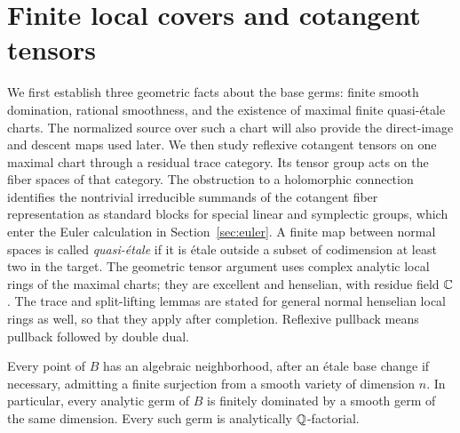 \section{Finite local covers and cotangent tensors}
\label{loc:section}
\label{sec:local-tensor}

We first establish three geometric facts about the base germs: finite
smooth domination, rational smoothness, and the existence of maximal
finite quasi-\'etale charts.  The normalized source over such a chart
will also provide the direct-image and descent maps used later.
We then study reflexive cotangent tensors on one maximal chart through
a residual trace category.  Its tensor group acts on the fiber spaces
of that category.  The obstruction to a holomorphic connection
identifies the nontrivial irreducible summands of the cotangent fiber
representation as standard blocks for special linear and symplectic groups,
which enter the Euler calculation in
Section~\ref{sec:euler}.  A finite
map between normal spaces is called \emph{quasi-\'etale} if it is
\'etale outside a subset of codimension at least two in the target.
The geometric tensor argument uses complex analytic local rings of the
maximal charts; they are excellent and henselian, with residue field
$\mathbb C$.  The trace and split-lifting lemmas are stated for general normal
henselian local rings as well, so that they apply after completion.
Reflexive pullback means pullback followed by double dual.

\begin{lemma}
\label{loc:smooth-domination}
Every point of $B$ has an algebraic neighborhood, after an \'etale
base change if necessary, admitting a finite surjection from a smooth
variety of dimension $n$.  In particular, every analytic germ of $B$
is finitely dominated by a smooth germ of the same dimension.
Every such germ is analytically $\mathbb Q$-factorial.
\end{lemma}

